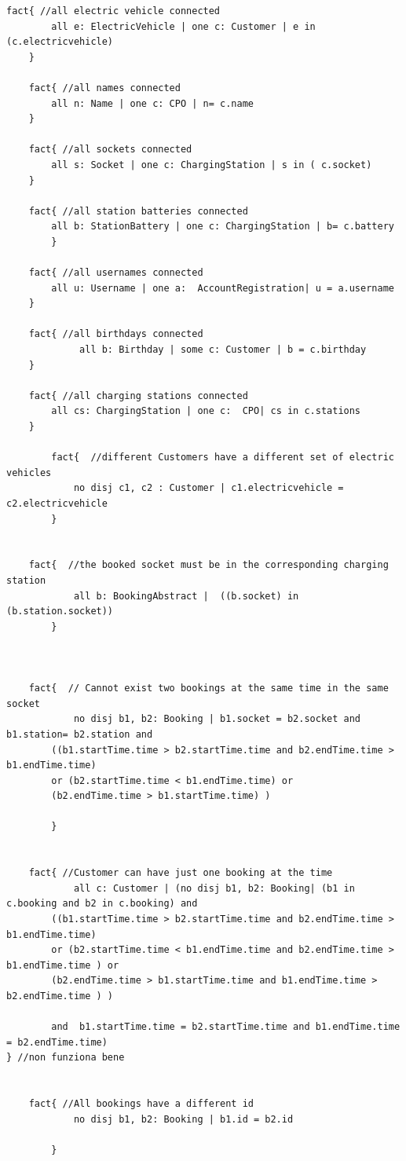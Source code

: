 \begin{lstlisting}[language=alloy]
	fact{ //all electric vehicle connected   
		all e: ElectricVehicle | one c: Customer | e in (c.electricvehicle)
	}	

	fact{ //all names connected   
		all n: Name | one c: CPO | n= c.name
	}

	fact{ //all sockets connected      
		all s: Socket | one c: ChargingStation | s in ( c.socket)
	}

	fact{ //all station batteries connected    
		all b: StationBattery | one c: ChargingStation | b= c.battery
		}

	fact{ //all usernames connected      
		all u: Username | one a:  AccountRegistration| u = a.username
	}

	fact{ //all birthdays connected      
			 all b: Birthday | some c: Customer | b = c.birthday
	}

	fact{ //all charging stations connected      
		all cs: ChargingStation | one c:  CPO| cs in c.stations
	}

    	fact{  //different Customers have a different set of electric vehicles   
    		no disj c1, c2 : Customer | c1.electricvehicle = c2.electricvehicle
    	}
	
	
	fact{  //the booked socket must be in the corresponding charging station   
    		all b: BookingAbstract |  ((b.socket) in (b.station.socket))
    	}
	
	

	fact{  // Cannot exist two bookings at the same time in the same socket
     		no disj b1, b2: Booking | b1.socket = b2.socket and b1.station= b2.station and 
		((b1.startTime.time > b2.startTime.time and b2.endTime.time > b1.endTime.time) 
		or (b2.startTime.time < b1.endTime.time) or
		(b2.endTime.time > b1.startTime.time) ) 
	
    	}


	fact{ //Customer can have just one booking at the time
     	 	all c: Customer | (no disj b1, b2: Booking| (b1 in c.booking and b2 in c.booking) and
		((b1.startTime.time > b2.startTime.time and b2.endTime.time > b1.endTime.time) 
		or (b2.startTime.time < b1.endTime.time and b2.endTime.time > b1.endTime.time ) or
		(b2.endTime.time > b1.startTime.time and b1.endTime.time > b2.endTime.time ) ) 

		and  b1.startTime.time = b2.startTime.time and b1.endTime.time = b2.endTime.time)
} //non funziona bene
			
    	
	fact{ //All bookings have a different id 
     	 	no disj b1, b2: Booking | b1.id = b2.id
	
    	}
	

\end{lstlisting}
